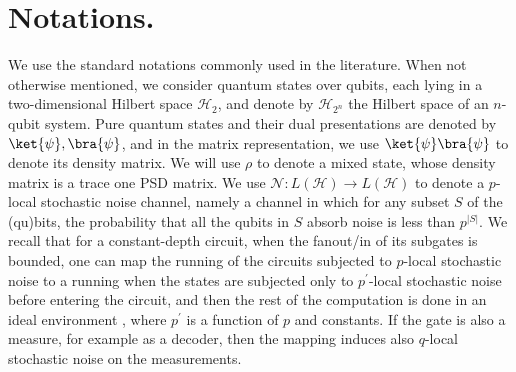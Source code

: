 
  \section{ Notations. } \label{sec:nota}

  We use the standard notations commonly used in the literature. When not otherwise mentioned, we consider quantum states over qubits, each lying in a two-dimensional Hilbert space $\mathcal{H}_{2}$, and denote by $\mathcal{H}_{2^n}$ the Hilbert space of an $n$-qubit system. Pure quantum states and their dual presentations are denoted by $\ket{\psi}, \bra{\psi}$, and in the matrix representation, we use $\ket{\psi}\bra{\psi}$ to denote its density matrix. We will use $\rho$ to denote a mixed state, whose density matrix is a trace one PSD matrix. We use $\mathcal{N} : L(\mathcal{H}) \rightarrow L(\mathcal{H})$ to denote a $p$-local stochastic noise channel, namely a channel in which for any subset $S$ of the (qu)bits, the probability that all the qubits in $S$ absorb noise is less than $p^{|S|}$. We recall that for a constant-depth circuit, when the fanout/in of its subgates is bounded, one can map the running of the circuits subjected to $p$-local stochastic noise to a running when the states are subjected only to $p^{\prime}$-local stochastic noise before entering the circuit, and then the rest of the computation is done in an ideal environment \cite{gottesman2014faulttolerant}, where $p^{\prime}$ is a function of $p$ and constants. If the gate is also a measure, for example as a decoder, then the mapping induces also $q$-local stochastic noise on the measurements.

